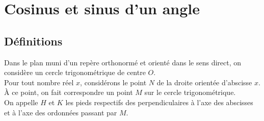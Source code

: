 \section{Cosinus et sinus d'un angle}
    \subsection{Définitions}
    
        \begin{minipage}{0.55\linewidth}
            Dans le plan muni d'un repère orthonormé \Rij et orienté dans le sens direct, on considère un cercle trigonométrique de centre $O$.\\
            Pour tout nombre réel $x$, considérons le point $N$ de la droite orientée d'abscisse $x$.\\ 
            À ce point, on fait correspondre un point $M$ sur le cercle trigonométrique.\\
            On appelle $H$ et $K$ les pieds respectifs des perpendiculaires à l'axe des abscisses et à l'axe des ordonnées passant par $M$.
        \end{minipage} \hfill
